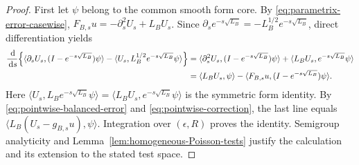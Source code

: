 \documentclass[12pt]{amsart}
\newcommand\dd{\,{\rm d}}
\theoremstyle{remark}
\begin{document}
\begin{proof}
First let \(\psi\) belong to the common smooth form core.  By
\eqref{eq:parametrix-error-casewise},
\(F_{B,s}u=-\partial_s^2U_s+L_BU_s\).  Since
\(\partial_se^{-s\sqrt{L_B}}
=-L_B^{1/2}e^{-s\sqrt{L_B}}\), direct differentiation yields
\begin{align*}
 \frac{\dd}{\dd s}\Bigl\{
  \langle\partial_sU_s,(I-e^{-s\sqrt{L_B}})\psi\rangle
  -\langle U_s,L_B^{1/2}e^{-s\sqrt{L_B}}\psi\rangle
 \Bigr\}
 ={}&\langle\partial_s^2U_s,(I-e^{-s\sqrt{L_B}})\psi\rangle+\langle L_BU_s,e^{-s\sqrt{L_B}}\psi\rangle\\
 ={}&\langle L_BU_s,\psi\rangle
    -\langle F_{B,s}u,(I-e^{-s\sqrt{L_B}})\psi\rangle.
\end{align*}
Here
\(\langle U_s,L_Be^{-s\sqrt{L_B}}\psi\rangle
=\langle L_BU_s,e^{-s\sqrt{L_B}}\psi\rangle\) is the symmetric form identity. By
\eqref{eq:pointwise-balanced-error} and
\eqref{eq:pointwise-correction}, the last line equals $\langle L_B(U_s-g_{B,s}u),\psi\rangle$. Integration over \((\epsilon,R)\) proves the identity.  Semigroup
analyticity and Lemma~\ref{lem:homogeneous-Poisson-tests} justify the
calculation and its extension to the stated test space.
\end{proof}
\end{document}
